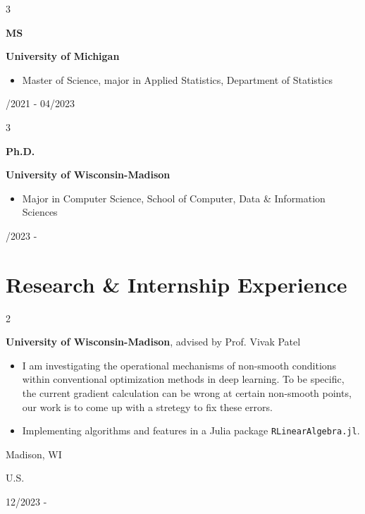 \documentclass[10pt, letterpaper]{article}
\newenvironment{highlights}{
    \begin{itemize}[
        topsep=0.10 cm,
        parsep=0.10 cm,
        partopsep=0pt,
        itemsep=0pt,
        leftmargin=0.4 cm + 10pt
    ]
}{
    \end{itemize}
} %
\newenvironment{twocolentry}[2][]{
    \onecolentry
    \def\secondColumn{#2}
    \setcolumnwidth{\fill, 4.5 cm}
    \begin{paracol}{2}
}{
    \switchcolumn \raggedleft \secondColumn
    \end{paracol}
    \endonecolentry
} %
\newenvironment{threecolentry}[3][]{
    \onecolentry
    \def\thirdColumn{#3}
    \setcolumnwidth{1 cm, \fill, 4.5 cm}
    \begin{paracol}{3}
    {\raggedright #2} \switchcolumn
}{
    \switchcolumn \raggedleft \thirdColumn
    \end{paracol}
    \endonecolentry
} %
\begin{document}
        \begin{threecolentry}{\textbf{MS}}{
            08/2021 - 04/2023
        }
            \textbf{University of Michigan}
            \begin{highlights}
                \item Master of Science, major in Applied Statistics, Department of Statistics
            \end{highlights}
        \end{threecolentry}

        \begin{threecolentry}{\textbf{Ph.D.}}{
            08/2023 - 
        }
            \textbf{University of Wisconsin-Madison}
            \begin{highlights}
                \item Major in Computer Science, School of Computer, Data \& Information Sciences
            \end{highlights}
        \end{threecolentry}


    
    \section{Research \& Internship Experience}



        
        \begin{twocolentry}{
            Madison, WI

            U.S.

            12/2023 - 
        }
            \textbf{University of Wisconsin-Madison}, advised by Prof. Vivak Patel
            \begin{highlights}
                \item I am investigating the operational mechanisms of non-smooth conditions
                within conventional optimization methods in deep learning. To be specific, the current gradient 
                calculation can be wrong at certain non-smooth points, our work is to come up with a stretegy to 
                fix these errors.
                \item Implementing algorithms and features in a Julia package \texttt{RLinearAlgebra.jl}.
            \end{highlights}
        \end{twocolentry}


        \vspace{0.2 cm}
\end{document}
